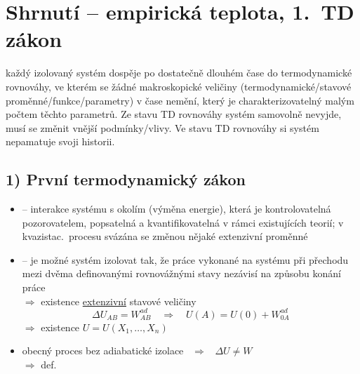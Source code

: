 \providecommand{\dbar}{{\mathchar'26\mkern-12mu d}}
\providecommand{\modreB}[1]{{\color{NavyBlue}\small\bfseries #1}}
\providecommand{\cerveneB}[1]{{\color{Red}\small\bfseries #1}}
\providecommand{\lightning}{\mathbin{\rotatebox[origin=c]{-60}{$\leadsto$}}}

\section{Shrnutí -- empirická teplota, 1.\ TD zákon}

\begin{veta}
každý izolovaný systém dospěje po dostatečně dlouhém čase do termodynamické rovnováhy, ve kterém se žádné makroskopické veličiny (termodynamické/stavové proměnné/funkce/parametry) v čase nemění, který je charakterizovatelný malým počtem těchto parametrů. Ze stavu TD rovnováhy systém samovolně nevyjde, musí se změnit vnější podmínky/vlivy. Ve stavu TD rovnováhy si systém nepamatuje svoji historii.
\end{veta}

\subsection*{1) První termodynamický zákon}
\begin{itemize}
  \item {} -- interakce systému s okolím (výměna energie), která je kontrolovatelná pozorovatelem, popsatelná a kvantifikovatelná v rámci existujících teorií; v kvazistac.\ procesu svázána se změnou nějaké extenzivní proměnné
  \item {} -- je možné systém izolovat tak, že  práce vykonané na systému při přechodu mezi dvěma definovanými rovnovážnými stavy nezávisí na způsobu konání práce \\
  $\Rightarrow$ existence \underline{extenzivní} stavové veličiny 
  \[
    \Delta U_{AB} = W_{AB}^{ad} \quad\Rightarrow\quad U(A) = U(0) + W_{0A}^{ad}
  \]
  $\Rightarrow$ existence  \qquad $U = U(X_1,\dots,X_n)$
  \item obecný proces bez adiabatické izolace \ $\Rightarrow$ \ $\Delta U \neq W$ \\
  $\Rightarrow$ def.\ 
\end{itemize}

